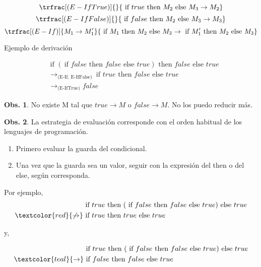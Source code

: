 \documentclass{report}
\theoremstyle{definition} %
\newtheorem{observation}{Obs.}[chapter]
\newcommand{\ifte}[3]{\ \text{if } #1 \text{ then } #2 \text{ else } #3}
\newcommand{\reduces}{\to}
\newcommand{\reducesTo}[1]{\reduces_\text{(#1)}}
\newcommand{\reduce}[2]{#1 \reduces #2}
\newcommand{\deriv}[3]{\trfrac[(#1)]{#2}{#3}}
\begin{document}
\[
    \deriv{E-IfTrue}
        {}
        {
            \reduce
                {\ifte{true}{M_2}{M_3}}
                {M_2}
        }
\]
\vspace{0.5cm}
\[
    \deriv{E-IfFalse}
        {}
        {
            \reduce
                {\ifte{false}{M_2}{M_3}}
                {M_3}
        }
\]
\vspace{0.5cm}
\[
    \deriv{E-If}
        {\reduce{M_1}{M_1'}}
        {
            \reduce
                {\ifte{M_1}{M_2}{M_3}}
                {\ifte{M_1'}{M_2}{M_3}}
        }
\]

Ejemplo de derivación

\begin{align*}
    &\ifte
        {(\ifte{false}{false}{true})}
        {false}
        {true}\\
    &\reducesTo{E-If, E-IfFalse}
        \ifte{true}{false}{true}\\
    &\reducesTo{E-IfTrue} false
\end{align*}

\begin{observation}
    No existe M tal que $\reduce{true}{M}$ o $\reduce{false}{M}$. No los puedo reducir más.
\end{observation}

\begin{observation}
    La estrategia de evaluación corresponde con el orden habitual de los
    lenguajes de programación.

    \begin{enumerate}
        \item Primero evaluar la guarda del condicional.
        \item Una vez que la guarda sea un valor, seguir con la expresión del
        then o del else, según corresponda.
    \end{enumerate}

    Por ejemplo,
    \begin{align*}
        &\ifte
            {true}
            {(\ifte{false}{false}{true})}
            {true}\\
        \textcolor{red}{\not\to} &\ifte{true}{true}{true}
    \end{align*}

    y,

    \begin{align*}
        &\ifte
            {true}
            {(\ifte{false}{false}{true})}
            {true}\\
        \textcolor{teal}{\to} &\ifte{false}{false}{true}
    \end{align*}
\end{observation}
\end{document}

